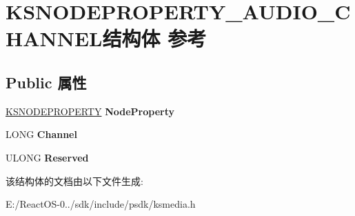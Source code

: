 \hypertarget{struct_k_s_n_o_d_e_p_r_o_p_e_r_t_y___a_u_d_i_o___c_h_a_n_n_e_l}{}\section{K\+S\+N\+O\+D\+E\+P\+R\+O\+P\+E\+R\+T\+Y\+\_\+\+A\+U\+D\+I\+O\+\_\+\+C\+H\+A\+N\+N\+E\+L结构体 参考}
\label{struct_k_s_n_o_d_e_p_r_o_p_e_r_t_y___a_u_d_i_o___c_h_a_n_n_e_l}
\subsection*{Public 属性}
\begin{DoxyCompactItemize}
\item 
\mbox{\label{struct_k_s_n_o_d_e_p_r_o_p_e_r_t_y___a_u_d_i_o___c_h_a_n_n_e_l_afc8bfc6926521ae3fefa896c8a5db9ce}} 
\hyperlink{struct_k_s_n_o_d_e_p_r_o_p_e_r_t_y}{K\+S\+N\+O\+D\+E\+P\+R\+O\+P\+E\+R\+TY} {\bfseries Node\+Property}
\item 
\mbox{\label{struct_k_s_n_o_d_e_p_r_o_p_e_r_t_y___a_u_d_i_o___c_h_a_n_n_e_l_ae6f4dbb2f5aa1e12e7e233caefdc1510}} 
L\+O\+NG {\bfseries Channel}
\item 
\mbox{\label{struct_k_s_n_o_d_e_p_r_o_p_e_r_t_y___a_u_d_i_o___c_h_a_n_n_e_l_a2162c15f91e6623bd9cd166c5c4b3ccf}} 
U\+L\+O\+NG {\bfseries Reserved}
\end{DoxyCompactItemize}


该结构体的文档由以下文件生成\+:\begin{DoxyCompactItemize}
\item 
E\+:/\+React\+O\+S-\/0../sdk/include/psdk/ksmedia.\+h\end{DoxyCompactItemize}
